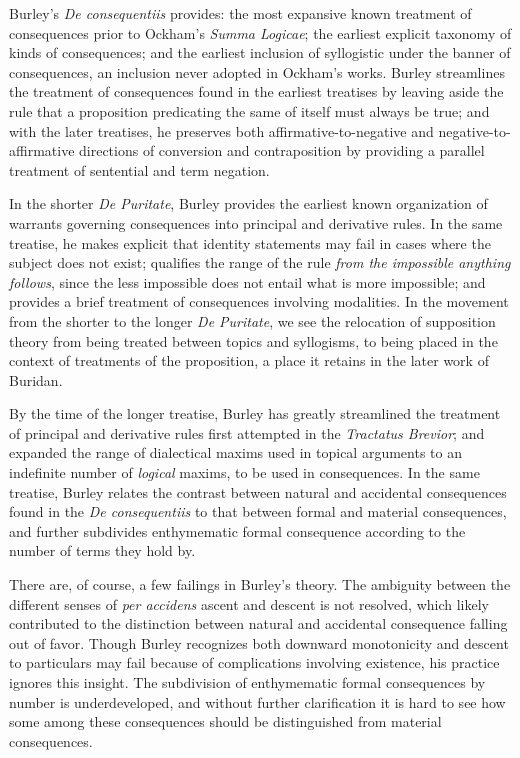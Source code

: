 \documentclass[]{article}
\begin{document}
Burley's \textit{De consequentiis} provides: the most expansive known treatment of consequences prior to Ockham's \textit{Summa Logicae}; the earliest explicit taxonomy of kinds of consequences; and the earliest inclusion of syllogistic under the banner of consequences, an inclusion never adopted in Ockham's works. Burley streamlines the treatment of consequences found in the earliest treatises by leaving aside the rule that a proposition predicating the same of itself must always be true; and with the later treatises, he preserves both affirmative-to-negative and negative-to-affirmative directions of conversion and contraposition by providing a parallel treatment of sentential and term negation.

In the shorter \textit{De Puritate}, Burley provides the earliest known organization of warrants governing consequences into principal and derivative rules. In the same treatise, he makes explicit that identity statements may fail in cases where the subject does not exist; qualifies the range of the rule \textit{from the impossible anything follows}, since the less impossible does not entail what is more impossible; and provides a brief treatment of consequences involving modalities. In the movement from the shorter to the longer \textit{De Puritate}, we see the relocation of supposition theory from being treated between topics and syllogisms, to being placed in the context of treatments of the proposition, a place it retains in the later work of Buridan.

By the time of the longer treatise, Burley has greatly streamlined the treatment of principal and derivative rules first attempted in the \textit{Tractatus Brevior}; and expanded the range of dialectical maxims used in topical arguments to an indefinite number of \textit{logical} maxims, to be used in consequences. In the same treatise, Burley relates the contrast between natural and accidental consequences found in the \textit{De consequentiis} to that between formal and material consequences, and further subdivides enthymematic formal consequence according to the number of terms they hold by.

There are, of course, a few failings in Burley's theory. The ambiguity between the different senses of \textit{per accidens} ascent and descent is not resolved, which likely contributed to the distinction between natural and accidental consequence falling out of favor. Though Burley recognizes both downward monotonicity and descent to particulars may fail because of complications involving existence, his practice ignores this insight. The subdivision of enthymematic formal consequences by number is underdeveloped, and without further clarification it is hard to see how some among these consequences should be distinguished from material consequences. 
\end{document}
